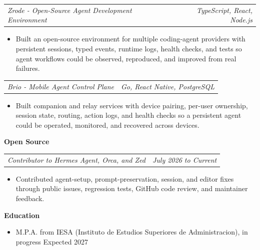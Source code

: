 \documentclass[10pt,letterpaper]{article}
\makeatletter
\newcommand{\bodyfont}{\fontsize{10.5}{15.75}\selectfont}
\newcommand{\sectiontitle}[1]{%
  \vspace{4pt}
  {\bodyfont\textbf{#1}}\par
  \nopagebreak[4]
  \vspace{2pt}
}
\newcommand{\roleline}[2]{%
  \begin{tabularx}{\textwidth}{@{}Xr@{}}
    \bodyfont\textit{#1} & \bodyfont\textit{#2}
  \end{tabularx}
  \nopagebreak[4]
  \vspace{1pt}
}
\makeatother
\begin{document}
\vspace{3pt}
\roleline{Zrode - Open-Source Agent Development Environment}{TypeScript, React, Node.js}
\begin{itemize}
  \item Built an open-source environment for multiple coding-agent providers with persistent sessions, typed events, runtime logs, health checks, and tests so agent workflows could be observed, reproduced, and improved from real failures.
\end{itemize}

\vspace{3pt}
\roleline{Brio - Mobile Agent Control Plane}{Go, React Native, PostgreSQL}
\begin{itemize}
  \item Built companion and relay services with device pairing, per-user ownership, session state, routing, action logs, and health checks so a persistent agent could be operated, monitored, and recovered across devices.
\end{itemize}

\sectiontitle{Open Source}

\roleline{Contributor to Hermes Agent, Orca, and Zed}{July 2026 to Current}
\begin{itemize}
  \item Contributed agent-setup, prompt-preservation, session, and editor fixes through public issues, regression tests, GitHub code review, and maintainer feedback.
\end{itemize}

\sectiontitle{Education}
\begin{itemize}
  \item M.P.A. from IESA (Instituto de Estudios Superiores de Administracion), in progress \hfill Expected 2027
\end{itemize}
\end{document}
